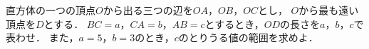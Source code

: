 \documentclass[../../main.tex]{subfiles}
\begin{document}
直方体の一つの頂点$O$から出る三つの辺を$OA$，$OB$，$OC$とし，
$O$から最も遠い頂点を$D$とする．
$BC=a$，$CA=b$，$AB=c$とするとき，$OD$の長さを$a$，$b$，$c$で表わせ．
また，$a=5$，$b=3$のとき，$c$のとりうる値の範囲を求めよ．
\end{document}
